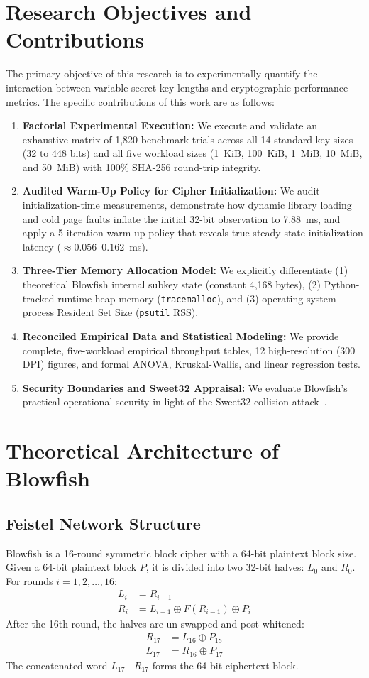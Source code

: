 \documentclass[conference]{IEEEtran}
\begin{document}
\section{Research Objectives and Contributions}
The primary objective of this research is to experimentally quantify the interaction between variable secret-key lengths and cryptographic performance metrics. The specific contributions of this work are as follows:
\begin{enumerate}
    \item \textbf{Factorial Experimental Execution:} We execute and validate an exhaustive matrix of 1,820 benchmark trials across all 14 standard key sizes (32 to 448 bits) and all five workload sizes (1~KiB, 100~KiB, 1~MiB, 10~MiB, and 50~MiB) with 100\% SHA-256 round-trip integrity.
    \item \textbf{Audited Warm-Up Policy for Cipher Initialization:} We audit initialization-time measurements, demonstrate how dynamic library loading and cold page faults inflate the initial 32-bit observation to 7.88~ms, and apply a 5-iteration warm-up policy that reveals true steady-state initialization latency ($\approx 0.056$--$0.162$~ms).
    \item \textbf{Three-Tier Memory Allocation Model:} We explicitly differentiate (1) theoretical Blowfish internal subkey state (constant 4,168 bytes), (2) Python-tracked runtime heap memory (\texttt{tracemalloc}), and (3) operating system process Resident Set Size (\texttt{psutil} RSS).
    \item \textbf{Reconciled Empirical Data and Statistical Modeling:} We provide complete, five-workload empirical throughput tables, 12 high-resolution (300 DPI) figures, and formal ANOVA, Kruskal-Wallis, and linear regression tests.
    \item \textbf{Security Boundaries and Sweet32 Appraisal:} We evaluate Blowfish's practical operational security in light of the Sweet32 collision attack~\cite{bhargavan2016sweet32}.
\end{enumerate}

\section{Theoretical Architecture of Blowfish}

\subsection{Feistel Network Structure}
Blowfish is a 16-round symmetric block cipher with a 64-bit plaintext block size. Given a 64-bit plaintext block $P$, it is divided into two 32-bit halves: $L_0$ and $R_0$. For rounds $i = 1, 2, \dots, 16$:
\begin{align}
L_i &= R_{i-1} \\
R_i &= L_{i-1} \oplus F(R_{i-1}) \oplus P_i
\end{align}
After the 16th round, the halves are un-swapped and post-whitened:
\begin{align}
R_{17} &= L_{16} \oplus P_{18} \\
L_{17} &= R_{16} \oplus P_{17}
\end{align}
The concatenated word $L_{17} \,||\, R_{17}$ forms the 64-bit ciphertext block.
\end{document}
